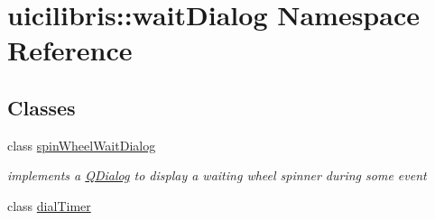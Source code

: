 \hypertarget{namespaceuicilibris_1_1waitDialog}{\section{uicilibris\-:\-:wait\-Dialog \-Namespace \-Reference}
\label{namespaceuicilibris_1_1waitDialog}
}
\subsection*{\-Classes}
\begin{DoxyCompactItemize}
\item 
class \hyperlink{classuicilibris_1_1waitDialog_1_1spinWheelWaitDialog}{spin\-Wheel\-Wait\-Dialog}
\begin{DoxyCompactList}\small\item\em implements a \hyperlink{classQDialog}{\-Q\-Dialog} to display a waiting wheel spinner during some event \end{DoxyCompactList}\item 
class \hyperlink{classuicilibris_1_1waitDialog_1_1dialTimer}{dial\-Timer}
\end{DoxyCompactItemize}
